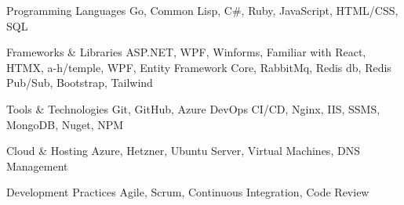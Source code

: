 
\begin{cvskills}

  \cvskill
    {Programming Languages} %
    {Go, Common Lisp, C\#, Ruby, JavaScript, HTML/CSS, SQL} %

  \cvskill
    {Frameworks \& Libraries} %
    {ASP.NET, WPF, Winforms, Familiar with React, HTMX, a-h/temple, WPF, Entity Framework Core, RabbitMq, Redis db, Redis Pub/Sub, Bootstrap, Tailwind} %

  \cvskill
    {Tools \& Technologies} %
    {Git, GitHub, Azure DevOps CI/CD, Nginx, IIS, SSMS, MongoDB, Nuget, NPM} %

  \cvskill
    {Cloud \& Hosting} %
    {Azure, Hetzner, Ubuntu Server, Virtual Machines, DNS Management} %

  \cvskill
    {Development Practices} %
    {Agile, Scrum, Continuous Integration, Code Review} %

\end{cvskills}